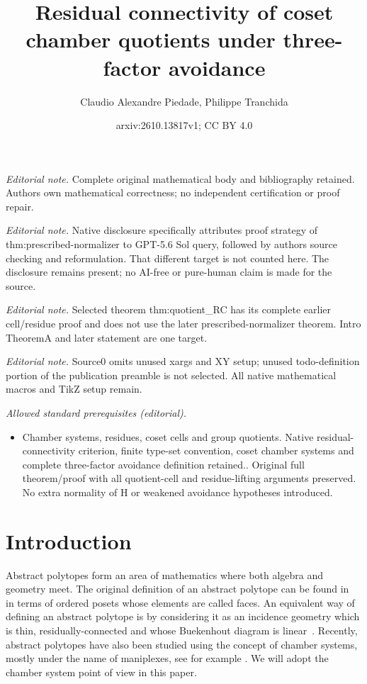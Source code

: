 \documentclass[10pt,a4paper]{amsart}
\title{Residual connectivity of coset chamber quotients under three-factor avoidance}
\author{Claudio Alexandre Piedade, Philippe Tranchida}
\date{arxiv:2610.13817v1; CC BY 4.0}
\begin{document}
\maketitle
\noindent\textit{Editorial note.} Complete original mathematical body and bibliography retained. Authors own mathematical correctness; no independent certification or proof repair.\par\medskip
\noindent\textit{Editorial note.} Native disclosure specifically attributes proof strategy of thm:prescribed-normalizer to GPT-5.6 Sol query, followed by authors source checking and reformulation. That different target is not counted here. The disclosure remains present; no AI-free or pure-human claim is made for the source.\par\medskip
\noindent\textit{Editorial note.} Selected theorem thm:quotient\_RC has its complete earlier cell/residue proof and does not use the later prescribed-normalizer theorem. Intro TheoremA and later statement are one target.\par\medskip
\noindent\textit{Editorial note.} Source0 omits unused xargs and XY setup; unused todo-definition portion of the publication preamble is not selected. All native mathematical macros and TikZ setup remain.\par\medskip
\noindent\textit{Allowed standard prerequisites (editorial).}\begin{itemize}
\item Chamber systems, residues, coset cells and group quotients. Native residual-connectivity criterion, finite type-set convention, coset chamber systems and complete three-factor avoidance definition retained.. Original full theorem/proof with all quotient-cell and residue-lifting arguments preserved. No extra normality of H or weakened avoidance hypotheses introduced.
\end{itemize}\medskip
\section{Introduction}

Abstract polytopes form an area of mathematics where both algebra and geometry meet. The original definition of an abstract polytope can be found in~\cite{ARP} in terms of ordered posets whose elements are called faces. 
An equivalent way of defining an abstract polytope is by considering it as an incidence geometry which is thin, residually-connected and whose Buekenhout diagram is linear~\cite{buekenhout2013diagram}.
Recently, abstract polytopes have also been studied using the concept of chamber systems, mostly under the name of maniplexes, see for example \cite{ManiplexesWilson,PolytopalityManiplexes, SymmetryTypeGraph}. We will adopt the chamber system point of view in this paper.
\end{document}
